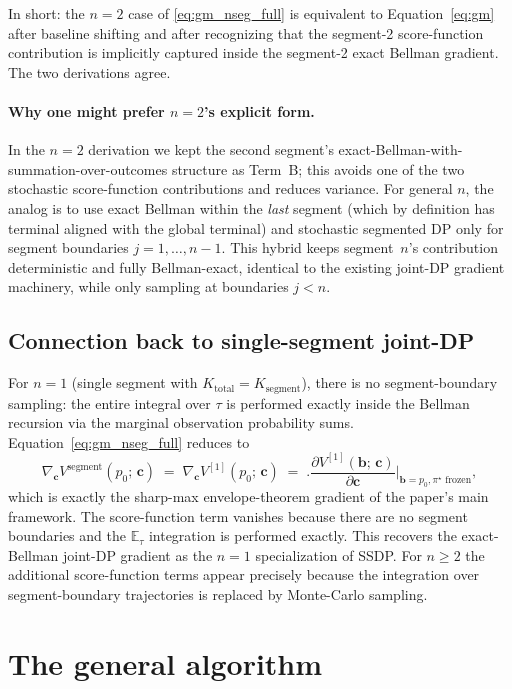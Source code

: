 \documentclass[11pt,a4paper]{article}
\newcommand{\bc}{\bm{c}}
\newcommand{\bb}{\bm{b}}
\newcommand{\E}{\mathbb{E}}
\begin{document}
In short: the $n = 2$ case of \eqref{eq:gm_nseg_full} is equivalent to
Equation~\eqref{eq:gm} after baseline shifting and after recognizing that the segment-2
score-function contribution is implicitly captured inside the segment-2 exact Bellman gradient.
The two derivations agree.

\paragraph{Why one might prefer $n = 2$'s explicit form.}  In the $n = 2$ derivation we kept
the second segment's exact-Bellman-with-summation-over-outcomes structure as Term~B; this
avoids one of the two stochastic score-function contributions and reduces variance.  For
general $n$, the analog is to use exact Bellman within the \emph{last} segment (which by
definition has terminal aligned with the global terminal) and stochastic segmented DP only
for segment boundaries $j = 1, \ldots, n-1$.  This hybrid keeps segment~$n$'s contribution
deterministic and fully Bellman-exact, identical to the existing joint-DP gradient
machinery, while only sampling at boundaries $j < n$.

\subsection{Connection back to single-segment joint-DP}
\label{sec:single_seg_check}

For $n = 1$ (single segment with $K_\mathrm{total} = K_\mathrm{segment}$), there is no
segment-boundary sampling: the entire integral over $\tau$ is performed exactly inside the
Bellman recursion via the marginal observation probability sums.
Equation~\eqref{eq:gm_nseg_full} reduces to
\[
\nabla_{\bc} V^\mathrm{segment}(p_0;\, \bc)
\;=\;
\nabla_{\bc} V^{[1]}(p_0;\, \bc)
\;=\;
\biggl.\frac{\partial V^{[1]}(\bb;\, \bc)}{\partial \bc}\biggr|_{\bb = p_0, \pi^\star \text{ frozen}},
\]
which is exactly the sharp-max envelope-theorem gradient of the paper's main framework.
The score-function term vanishes because there are no segment boundaries and the $\E_\tau$
integration is performed exactly.  This recovers the exact-Bellman joint-DP gradient as
the $n = 1$ specialization of SSDP.  For $n \ge 2$ the additional score-function terms
appear precisely because the integration over segment-boundary trajectories is replaced by
Monte-Carlo sampling.

\section{The general algorithm}
\end{document}

